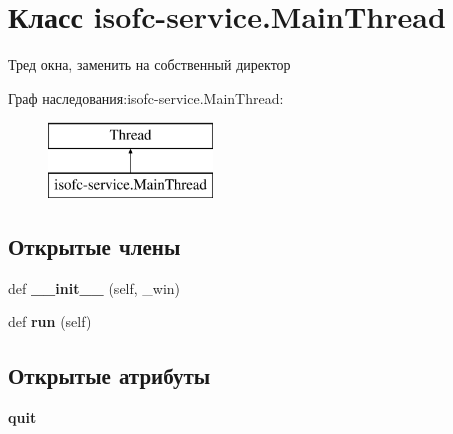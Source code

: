 \hypertarget{classisofc-service_1_1MainThread}{}\section{Класс isofc-\/service.Main\+Thread}
\label{classisofc-service_1_1MainThread}


Тред окна, заменить на собственный директор  


Граф наследования\+:isofc-\/service.Main\+Thread\+:\begin{figure}[H]
\begin{center}
\leavevmode
\includegraphics[height=2.000000cm]{classisofc-service_1_1MainThread}
\end{center}
\end{figure}
\subsection*{Открытые члены}
\begin{DoxyCompactItemize}
\item 
\mbox{\label{classisofc-service_1_1MainThread_a7e84bb80f26b602f53f06a4be88adfd9}} 
def {\bfseries \+\_\+\+\_\+init\+\_\+\+\_\+} (self, \+\_\+win)
\item 
\mbox{\label{classisofc-service_1_1MainThread_a800f6970dd13e9d2d75127b48853ef49}} 
def {\bfseries run} (self)
\end{DoxyCompactItemize}
\subsection*{Открытые атрибуты}
\begin{DoxyCompactItemize}
\item 
\mbox{\label{classisofc-service_1_1MainThread_acc8a8558957d8cac800ba133e0b7a6af}} 
{\bfseries quit}
\end{DoxyCompactItemize}
